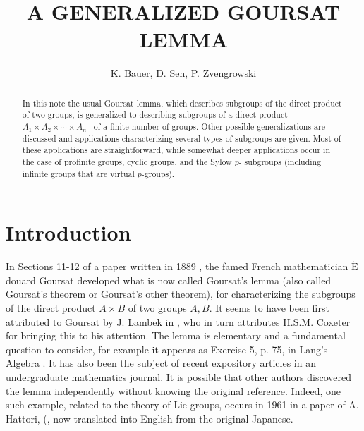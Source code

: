\documentclass[11pt]{article}
\date{}
\theoremstyle{change}
\newcommand{\<}{\langle}
\renewcommand{\>}{\rangle}
\begin{document}
\title{A GENERALIZED GOURSAT LEMMA}







\author{ K. Bauer,  D. Sen,  P. Zvengrowski }

\maketitle


\begin{abstract}


In this note the usual Goursat lemma, which describes subgroups of
the direct product of two groups, is generalized to describing subgroups
of a direct product \ $A_1\times A_2 \times \cdots \times A_n$ \ of a 
finite number of groups. Other possible generalizations are discussed and
 applications characterizing several types of subgroups are given. Most
of these applications are straightforward, while somewhat deeper applications
occur in the case of profinite groups,
 cyclic groups, and the Sylow $p$- subgroups (including
infinite groups that are virtual $p$-groups).


\end{abstract}

\section{Introduction} \label{sec:1}

In Sections 11-12 of a paper written in 1889 \cite{Goursat}, the famed French mathematician $\acute{\mbox{E}}$douard Goursat developed what is now called Goursat's lemma (also called Goursat's theorem or Goursat's other theorem), for characterizing the subgroups of the direct product $A\times B$ of two groups $A,B$. It seems to have been first attributed to Goursat by J. Lambek in \cite{Lambek2, Lambek1}, who in turn attributes H.S.M. Coxeter for bringing this to his attention. The lemma is elementary and a fundamental question to consider, for example it appears as Exercise 5, p. 75, in Lang's Algebra \cite{Lang}. It has also been the subject of recent expository articles \cite{Petrillo1, Petrillo2} in an undergraduate mathematics journal. It is possible that other authors discovered the lemma independently without knowing the original reference. Indeed, one such example, related to the theory of Lie groups,
 occurs in 1961 in a paper of A. Hattori, (\cite[Section 2.3]{Hattori}, now translated into English \cite{Z} from the original Japanese.
\end{document}

